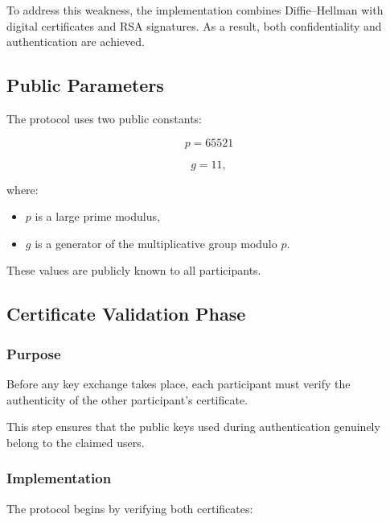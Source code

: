 \documentclass[12pt]{article}
\begin{document}
To address this weakness, the implementation combines Diffie--Hellman with
digital certificates and RSA signatures. As a result, both confidentiality and
authentication are achieved.


\subsection{Public Parameters}

The protocol uses two public constants:

\begin{equation}
p = 65521
\end{equation}

\begin{equation}
g = 11,
\end{equation}

where:

\begin{itemize}
\item $p$ is a large prime modulus,
\item $g$ is a generator of the multiplicative group modulo $p$.
\end{itemize}

These values are publicly known to all participants.


\subsection{Certificate Validation Phase}

\subsubsection{Purpose}

Before any key exchange takes place, each participant must verify the
authenticity of the other participant's certificate.

This step ensures that the public keys used during authentication genuinely
belong to the claimed users.

\subsubsection{Implementation}

The protocol begins by verifying both certificates:
\end{document}
